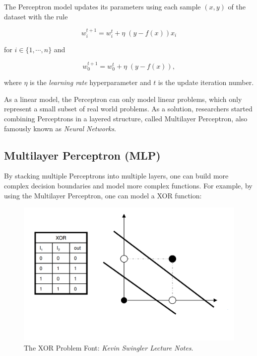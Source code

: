 The Perceptron model updates its parameters using each sample \((x, y)\) of the dataset with the rule

\begin{equation}
    w_i^{t + 1} = w_i^t + \eta \; (y - f(x)) x_i
    \label{eq:perceptron_update}  
\end{equation}

\noindent for \(i \in \{1, \cdots, n\}\) and

\begin{equation}
    w_0^{t + 1} = w_0^t + \eta \; (y - f(x)),  
\end{equation}

\noindent where \(\eta\) is the \emph{learning rate} hyperparameter and \(t\) is the update iteration number.

As a linear model, the Perceptron can only model linear problems, which only represent a small subset of real world problems.
As a solution, researchers started combining Perceptrons in a layered structure, called Multilayer Perceptron, also famously known as \emph{Neural Networks}.

\subsection{Multilayer Perceptron (MLP)}

By stacking multiple Perceptrons into multiple layers, one can build more complex decision boundaries and model more complex functions. 
For example, by using the Multilayer Perceptron, one can model a XOR function: 

\begin{figure}
    \centering
    \includegraphics[scale=0.4]{figuras/xor_problem.png}
    \caption{The XOR Problem Font: \emph{Kevin Swingler Lecture Notes}. \label{fig:xor_problem}}
\end{figure}

